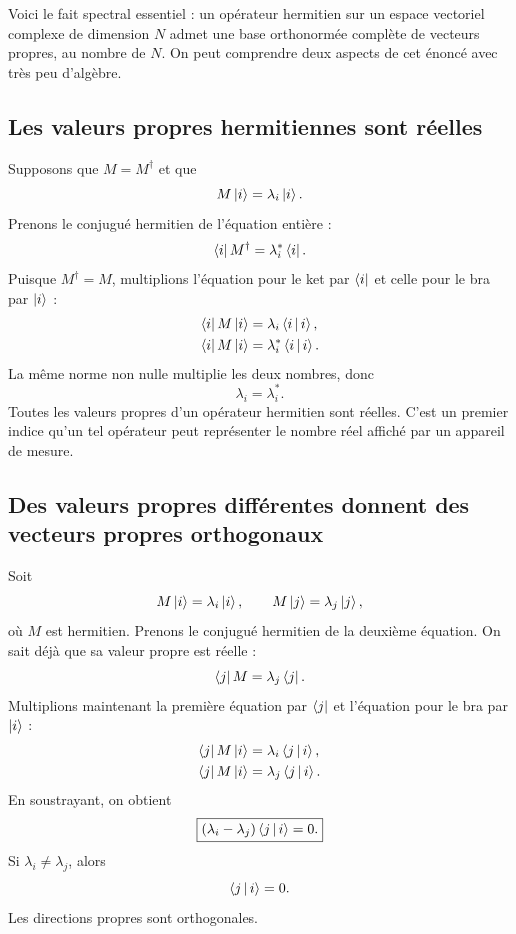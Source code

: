 Voici le fait spectral essentiel : un opérateur hermitien sur un espace vectoriel complexe de dimension \(N\) admet une base orthonormée complète de vecteurs propres, au nombre de \(N\). On peut comprendre deux aspects de cet énoncé avec très peu d’algèbre.

\subsection{Les valeurs propres hermitiennes sont réelles}

Supposons que \(M=M^\dagger\) et que
\[
M\left\lvert i\right\rangle=\lambda_i\left\lvert i\right\rangle.
\]
Prenons le conjugué hermitien de l’équation entière :
\begin{equation}
\left\langle i\right\rvert M^\dagger=\lambda_i^*\left\langle i\right\rvert.
\label{eq:eigen-bra-equation}
\end{equation}
Puisque \(M^\dagger=M\), multiplions l’équation pour le ket par \(\left\langle i\right\rvert\) et celle pour le bra par \(\left\lvert i\right\rangle\) :
\begin{align}
\left\langle i\right\rvert M\left\lvert i\right\rangle&=\lambda_i\left\langle i\,\middle|\,i\right\rangle,\\
\left\langle i\right\rvert M\left\lvert i\right\rangle&=\lambda_i^*\left\langle i\,\middle|\,i\right\rangle.
\end{align}
La même norme non nulle multiplie les deux nombres, donc
\begin{equation}
\lambda_i=\lambda_i^*.
\end{equation}
Toutes les valeurs propres d’un opérateur hermitien sont réelles. C’est un premier indice qu’un tel opérateur peut représenter le nombre réel affiché par un appareil de mesure.

\subsection{Des valeurs propres différentes donnent des vecteurs propres orthogonaux}

Soit
\[
M\left\lvert i\right\rangle=\lambda_i\left\lvert i\right\rangle,
\qquad
M\left\lvert j\right\rangle=\lambda_j\left\lvert j\right\rangle,
\]
où \(M\) est hermitien. Prenons le conjugué hermitien de la deuxième équation. On sait déjà que sa valeur propre est réelle :
\[
\left\langle j\right\rvert M=\lambda_j\left\langle j\right\rvert.
\]
Multiplions maintenant la première équation par \(\left\langle j\right\rvert\) et l’équation pour le bra par \(\left\lvert i\right\rangle\) :
\begin{align}
\left\langle j\right\rvert M\left\lvert i\right\rangle&=\lambda_i\left\langle j\,\middle|\,i\right\rangle,\\
\left\langle j\right\rvert M\left\lvert i\right\rangle&=\lambda_j\left\langle j\,\middle|\,i\right\rangle.
\end{align}
En soustrayant, on obtient
\begin{equation}
\boxed{(\lambda_i-\lambda_j)\left\langle j\,\middle|\,i\right\rangle=0.}
\label{eq:hermitian-orthogonality}
\end{equation}
Si \(\lambda_i\ne\lambda_j\), alors
\[
\left\langle j\,\middle|\,i\right\rangle=0.
\]
Les directions propres sont orthogonales.

